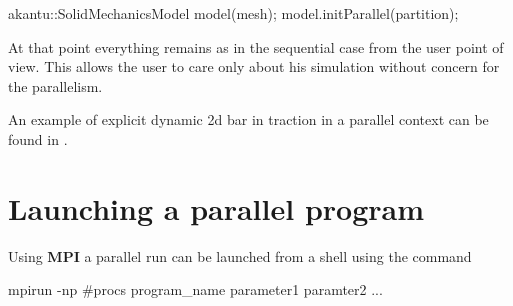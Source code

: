 \begin{cpp}
  akantu::SolidMechanicsModel model(mesh);
  model.initParallel(partition);
\end{cpp} 

At that point everything remains as in the sequential case from 
the user point of view. This allows the user to care only 
about his simulation without concern for the parallelism.

An example of explicit dynamic 2d bar in traction in a parallel
context can be found in .

\section{Launching a parallel program}

Using \textbf{MPI} a parallel run can be launched from a shell 
using the command 

\begin{cpp}
  mpirun -np #procs program_name parameter1 paramter2 ...
\end{cpp} 
